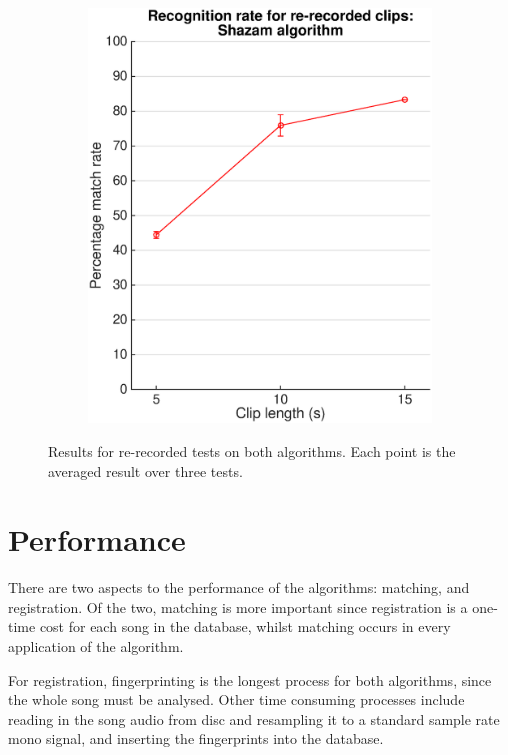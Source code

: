 \documentclass[12pt,a4paper,twoside,openright]{report}
\begin{document}
\begin{figure}[htbp!]
\begin{subfigure}{0.5\textwidth}
     	\includegraphics[width=0.95\linewidth]{./figs/constellation_passthrough.eps} 
    \end{subfigure}

    \caption{Results for re-recorded tests on both algorithms. Each point is the averaged result over three tests.}
    \label{fig:re-recorded_results}
\end{figure}

\section{Performance}

There are two aspects to the performance of the algorithms: matching, and registration. Of the two, matching is more important since registration is a one-time cost for each song in the database, whilst matching occurs in every application of the algorithm. 

For registration, fingerprinting is the longest process for both algorithms, since the whole song must be analysed. Other time consuming processes include reading in the song audio from disc and resampling it to a standard sample rate mono signal, and inserting the fingerprints into the database.
\end{document}
